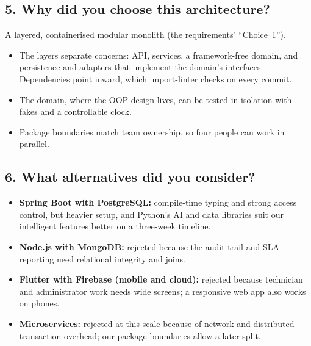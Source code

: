 \subsection*{5. Why did you choose this architecture?}
A layered, containerised modular monolith (the requirements' ``Choice~1'').
\begin{itemize}
  \item The layers separate concerns: API, services, a framework-free domain, and
    persistence and adapters that implement the domain's interfaces. Dependencies point
    inward, which import-linter checks on every commit.
  \item The domain, where the OOP design lives, can be tested in isolation with fakes and a
    controllable clock.
  \item Package boundaries match team ownership, so four people can work in parallel.
\end{itemize}

\subsection*{6. What alternatives did you consider?}
\begin{itemize}
  \item \textbf{Spring Boot with PostgreSQL:} compile-time typing and strong access control,
    but heavier setup, and Python's AI and data libraries suit our intelligent features better
    on a three-week timeline.
  \item \textbf{Node.js with MongoDB:} rejected because the audit trail and SLA reporting need
    relational integrity and joins.
  \item \textbf{Flutter with Firebase (mobile and cloud):} rejected because technician and
    administrator work needs wide screens; a responsive web app also works on phones.
  \item \textbf{Microservices:} rejected at this scale because of network and distributed-
    transaction overhead; our package boundaries allow a later split.
\end{itemize}

